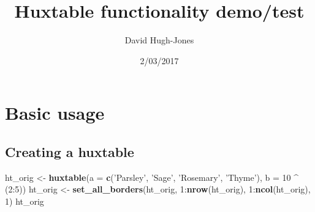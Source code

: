 \documentclass[]{article}
\title{Huxtable functionality demo/test}
\author{David Hugh-Jones}
\date{2/03/2017}
\newenvironment{Shaded}{\begin{snugshade}}{\end{snugshade}}
\newcommand{\KeywordTok}[1]{\textcolor[rgb]{0.13,0.29,0.53}{\textbf{{#1}}}}
\newcommand{\DataTypeTok}[1]{\textcolor[rgb]{0.13,0.29,0.53}{{#1}}}
\newcommand{\DecValTok}[1]{\textcolor[rgb]{0.00,0.00,0.81}{{#1}}}
\newcommand{\StringTok}[1]{\textcolor[rgb]{0.31,0.60,0.02}{{#1}}}
\newcommand{\NormalTok}[1]{{#1}}
\begin{document}
\maketitle

\section{Basic usage}\label{basic-usage}

\subsection{Creating a huxtable}\label{creating-a-huxtable}

\begin{Shaded}
\begin{Highlighting}[]
\NormalTok{ht_orig <-}\StringTok{ }\KeywordTok{huxtable}\NormalTok{(}\DataTypeTok{a =} \KeywordTok{c}\NormalTok{(}\StringTok{'Parsley'}\NormalTok{, }\StringTok{'Sage'}\NormalTok{, }\StringTok{'Rosemary'}\NormalTok{, }\StringTok{'Thyme'}\NormalTok{), }\DataTypeTok{b =} \DecValTok{10} \NormalTok{^}\StringTok{ }\NormalTok{(}\DecValTok{2}\NormalTok{:}\DecValTok{5}\NormalTok{)) }
\NormalTok{ht_orig <-}\StringTok{ }\KeywordTok{set_all_borders}\NormalTok{(ht_orig, }\DecValTok{1}\NormalTok{:}\KeywordTok{nrow}\NormalTok{(ht_orig), }\DecValTok{1}\NormalTok{:}\KeywordTok{ncol}\NormalTok{(ht_orig), }\DecValTok{1}\NormalTok{)}
\NormalTok{ht_orig}
\end{Highlighting}
\end{Shaded}
\end{document}
